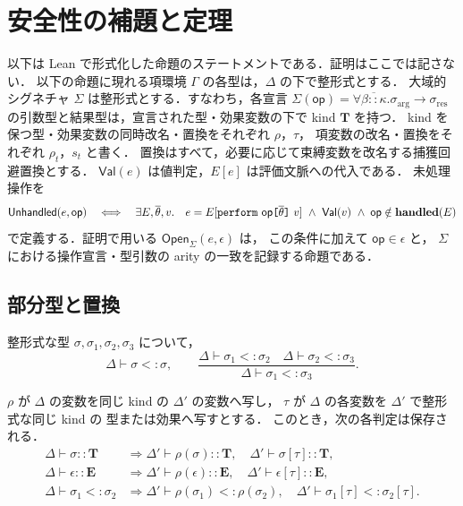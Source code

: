 \section{安全性の補題と定理}
\label{sec:systemfxi-safety}

以下は Lean で形式化した命題のステートメントである．証明はここでは記さない．
以下の命題に現れる項環境 $\Gamma$ の各型は，$\Delta$ の下で整形式とする．
大域的シグネチャ $\Sigma$ は整形式とする．すなわち，各宣言
$\Sigma(\mathsf{op})=
 \forall\overline{\beta::\kappa}.
 \sigma_{\mathrm{arg}}\to\sigma_{\mathrm{res}}$
の引数型と結果型は，宣言された型・効果変数の下で kind $\mathbf{T}$ を持つ．
kind を保つ型・効果変数の同時改名・置換をそれぞれ $\rho$，$\tau$，
項変数の改名・置換をそれぞれ $\rho_t$，$s_t$ と書く．
置換はすべて，必要に応じて束縛変数を改名する捕獲回避置換とする．
$\mathsf{Val}(e)$ は値判定，$E[e]$ は評価文脈への代入である．
未処理操作を
\[
  \mathsf{Unhandled}(e,\mathsf{op})
  \quad\Longleftrightarrow\quad
  \exists E,\overline{\theta},v.\quad
    e=E[\texttt{perform}~\mathsf{op}
      \texttt{[} \overline{\theta} \texttt{]}~v]
    \ \land\ \mathsf{Val}(v)
    \ \land\;
    \mathsf{op}\notin\mathbf{handled}(E)
\]
で定義する．証明で用いる $\mathsf{Open}_{\Sigma}(e,\epsilon)$ は，
この条件に加えて $\mathsf{op}\in\epsilon$ と，
$\Sigma$ における操作宣言・型引数の arity の一致を記録する命題である．

\subsection{部分型と置換}

\begin{lemma}[部分型の反射律と推移律]
\label{lem:fxi-subtyping}
整形式な型 $\sigma,\sigma_1,\sigma_2,\sigma_3$ について，
\[
  \Delta\vdash\sigma<:\sigma,
  \qquad
  \frac{\Delta\vdash\sigma_1<:\sigma_2
        \quad\Delta\vdash\sigma_2<:\sigma_3}
       {\Delta\vdash\sigma_1<:\sigma_3}.
\]
\end{lemma}

\begin{lemma}[型・効果変数の改名と置換]
\label{lem:fxi-type-structural}
$\rho$ が $\Delta$ の変数を同じ kind の $\Delta'$ の変数へ写し，
$\tau$ が $\Delta$ の各変数を $\Delta'$ で整形式な同じ kind の
型または効果へ写すとする．
このとき，次の各判定は保存される．
\begin{align*}
  \Delta\vdash\sigma::\mathbf{T}
    &\Longrightarrow
      \Delta'\vdash\rho(\sigma)::\mathbf{T},
      \quad
      \Delta'\vdash\sigma[\tau]::\mathbf{T},\\
  \Delta\vdash\epsilon::\mathbf{E}
    &\Longrightarrow
      \Delta'\vdash\rho(\epsilon)::\mathbf{E},
      \quad
      \Delta'\vdash\epsilon[\tau]::\mathbf{E},\\
  \Delta\vdash\sigma_1<:\sigma_2
    &\Longrightarrow
      \Delta'\vdash\rho(\sigma_1)<:\rho(\sigma_2),
      \quad
      \Delta'\vdash\sigma_1[\tau]<:\sigma_2[\tau].
\end{align*}
\end{lemma}

